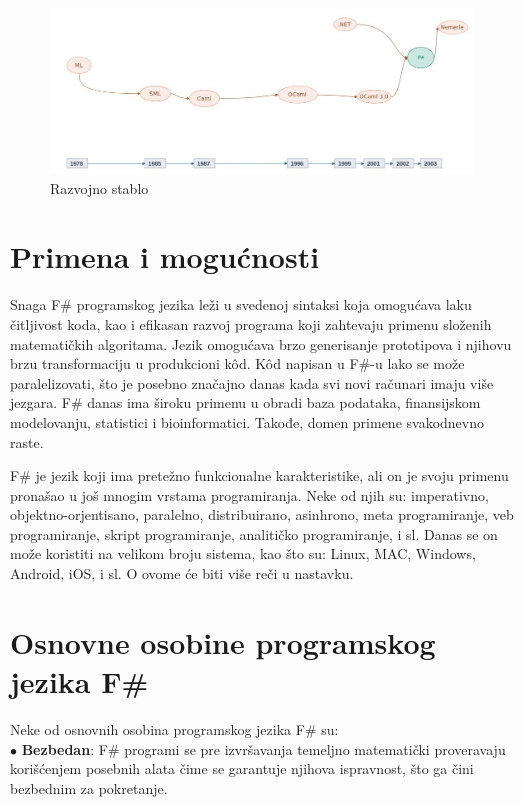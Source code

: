 \documentclass[a4paper]{article}
\begin{document}
\begin{figure}[h!]
\begin{center}
\includegraphics[scale=0.255]{stablo.jpg}
\end{center}
\caption{Razvojno stablo}
\label{fig:stablo}
\end{figure}

\section{Primena i mogućnosti}
\label{sec:primena}

Snaga F\# programskog jezika leži u svedenoj sintaksi koja omogućava laku čitljivost koda, kao i efikasan razvoj programa koji zahtevaju primenu složenih matematičkih algoritama. Jezik omogućava brzo generisanje prototipova i njihovu brzu transformaciju u produkcioni kôd. Kôd napisan u F\#-u lako se može paralelizovati, što je posebno značajno danas kada svi novi računari imaju više jezgara. F\# danas ima široku primenu u obradi baza podataka, finansijskom modelovanju, statistici i bioinformatici. Takođe, domen primene svakodnevno raste.

F\# je jezik koji ima pretežno funkcionalne karakteristike, ali on je svoju primenu pronašao u još mnogim vrstama programiranja. Neke od njih su: imperativno, objektno-orjentisano, paralelno, distribuirano, asinhrono, meta programiranje, veb programiranje, skript programiranje, analitičko programiranje, i sl. Danas se on može koristiti na velikom broju sistema, kao što su: Linux, MAC, Windows, Android, iOS, i sl. O ovome će biti više reči u nastavku. 


\section{Osnovne osobine programskog jezika F\#}

Neke od osnovnih osobina programskog jezika F\# su:\\

	$\bullet$ \textbf{Bezbedan}: F\# programi se pre izvršavanja temeljno matematički proveravaju korišćenjem posebnih alata čime se garantuje njihova ispravnost, što ga čini bezbednim za pokretanje.
\end{document}
